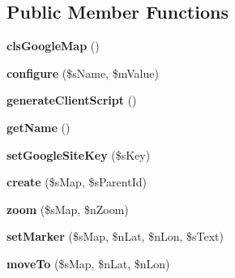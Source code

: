 \subsection*{Public Member Functions}
\begin{DoxyCompactItemize}
\item 
\hypertarget{classclsGoogleMap_a03f1e7a6a2916de95bda07dab3bc4f23}{
{\bfseries clsGoogleMap} ()}
\label{classclsGoogleMap_a03f1e7a6a2916de95bda07dab3bc4f23}

\item 
\hypertarget{classclsGoogleMap_a3eb5df55b60014f3596ff2257a4e113a}{
{\bfseries configure} (\$sName, \$mValue)}
\label{classclsGoogleMap_a3eb5df55b60014f3596ff2257a4e113a}

\item 
\hypertarget{classclsGoogleMap_a56701d2d8c9222b23e10265ef591cb2f}{
{\bfseries generateClientScript} ()}
\label{classclsGoogleMap_a56701d2d8c9222b23e10265ef591cb2f}

\item 
\hypertarget{classclsGoogleMap_ac0fa04ea8344038f8bfa9c2248533989}{
{\bfseries getName} ()}
\label{classclsGoogleMap_ac0fa04ea8344038f8bfa9c2248533989}

\item 
\hypertarget{classclsGoogleMap_ad474087da1030f8b51567de73affe482}{
{\bfseries setGoogleSiteKey} (\$sKey)}
\label{classclsGoogleMap_ad474087da1030f8b51567de73affe482}

\item 
\hypertarget{classclsGoogleMap_a08b6376d826504bd1f390ffb725dfabb}{
{\bfseries create} (\$sMap, \$sParentId)}
\label{classclsGoogleMap_a08b6376d826504bd1f390ffb725dfabb}

\item 
\hypertarget{classclsGoogleMap_adf07b37e7e297651b206461039c180ae}{
{\bfseries zoom} (\$sMap, \$nZoom)}
\label{classclsGoogleMap_adf07b37e7e297651b206461039c180ae}

\item 
\hypertarget{classclsGoogleMap_a097b0acbe6487b9fc6631146b859061c}{
{\bfseries setMarker} (\$sMap, \$nLat, \$nLon, \$sText)}
\label{classclsGoogleMap_a097b0acbe6487b9fc6631146b859061c}

\item 
\hypertarget{classclsGoogleMap_a5477c2c0f0ca6a6df19ee35449d76230}{
{\bfseries moveTo} (\$sMap, \$nLat, \$nLon)}
\label{classclsGoogleMap_a5477c2c0f0ca6a6df19ee35449d76230}

\end{DoxyCompactItemize}

